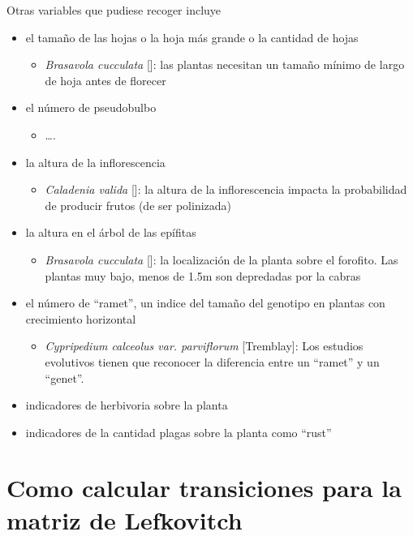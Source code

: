 \documentclass[
]{book}
\providecommand{\tightlist}{%
  \setlength{\itemsep}{0pt}\setlength{\parskip}{0pt}}
\theoremstyle{definition}
\theoremstyle{definition}
\theoremstyle{definition}
\theoremstyle{definition}
\theoremstyle{remark}
\begin{document}
Otras variables que pudiese recoger incluye

\begin{itemize}
\item
  el tamaño de las hojas o la hoja más grande o la cantidad de hojas

  \begin{itemize}
  \tightlist
  \item
    \emph{Brasavola cucculata} {[}{]}: las plantas necesitan un tamaño mínimo de largo de hoja antes de florecer
  \end{itemize}
\item
  el número de pseudobulbo

  \begin{itemize}
  \tightlist
  \item
    \ldots.
  \end{itemize}
\item
  la altura de la inflorescencia

  \begin{itemize}
  \tightlist
  \item
    \emph{Caladenia valida} {[}{]}: la altura de la inflorescencia impacta la probabilidad de producir frutos (de ser polinizada)
  \end{itemize}
\item
  la altura en el árbol de las epífitas

  \begin{itemize}
  \tightlist
  \item
    \emph{Brasavola cucculata} {[}{]}: la localización de la planta sobre el forofito. Las plantas muy bajo, menos de 1.5m son depredadas por la cabras
  \end{itemize}
\item
  el número de ``ramet'', un indice del tamaño del genotipo en plantas con crecimiento horizontal

  \begin{itemize}
  \tightlist
  \item
    \emph{Cypripedium calceolus var. parviflorum} {[}Tremblay{]}: Los estudios evolutivos tienen que reconocer la diferencia entre un ``ramet'' y un ``genet''.
  \end{itemize}
\item
  indicadores de herbivoria sobre la planta
\item
  indicadores de la cantidad plagas sobre la planta como ``rust''
\end{itemize}

\chapter{Como calcular transiciones para la matriz de Lefkovitch}\label{como-calcular-transiciones-para-la-matriz-de-lefkovitch}
\end{document}
